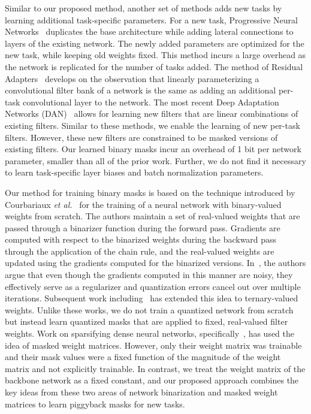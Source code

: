 \documentclass{llncs}
\begin{document}
Similar to our proposed method, another set of methods adds new tasks by learning additional task-specific parameters. For a new task, Progressive Neural Networks~\cite{rusu2016progressive} duplicates the base architecture while adding lateral connections to layers of the existing network. The newly added parameters are optimized for the new task, while keeping old weights fixed. This method incurs a large overhead as the network is replicated for the number of tasks added. 
The method of Residual Adapters~\cite{rebuffi2017learning} develops on the observation that linearly parameterizing a convolutional filter bank of a network is the same as adding an additional per-task convolutional layer to the network. 
The most recent Deep Adaptation Networks (DAN)~\cite{rosenfeld2017incremental} allows for learning new filters that are linear combinations of existing filters. Similar to these methods, we enable the learning of new per-task filters. However, these new filters are constrained to be masked versions of existing filters.
Our learned binary masks incur an overhead of 1 bit per network parameter, smaller than all of the prior work. Further, we do not find it necessary to learn task-specific layer biases and batch normalization parameters.

Our method for training binary masks is based on the technique introduced by Courbariaux \emph{et al.}~\cite{courbariaux2015binaryconnect,hubara2016binarized} for the training of a neural network with binary-valued weights from scratch. The authors maintain a set of real-valued weights that are passed through a binarizer function during the forward pass. Gradients are computed with respect to the binarized weights during the backward pass through the application of the chain rule, and the real-valued weights are updated using the gradients computed for the binarized versions. In~\cite{courbariaux2015binaryconnect}, the authors argue that even though the gradients computed in this manner are noisy, they effectively serve as a regularizer and quantization errors cancel out over multiple iterations. Subsequent work including~\cite{li2016ternary,zhu2016trained} has extended this idea to ternary-valued weights. Unlike these works, we do not train a quantized network from scratch but instead learn quantized masks that are applied to fixed, real-valued filter weights. Work on sparsifying dense neural networks, specifically~\cite{guo2016dynamic}, has used the idea of masked weight matrices. However, only their weight matrix was trainable and their mask values were a fixed function of the magnitude of the weight matrix and not explicitly trainable. 
In contrast, we treat the weight matrix of the backbone network as a fixed constant, and our proposed approach combines the key ideas from these two areas of network binarization and masked weight matrices to learn piggyback masks for new tasks.
\end{document}
